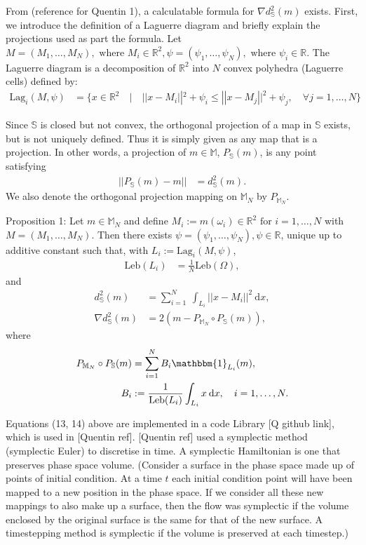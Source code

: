 \documentclass[11pt, oneside]{article}   	%
\newcommand{\R}{\mathbb{R}}
\newcommand{\MN}{\mathbb{M}_N}
\newcommand{\dsmsq}{d^{2}_{\mathbb{S}}(m)}
\newcommand{\graddsmsq}{\nabla{d^{2}_{\mathbb{S}}(m)}}
\newcommand{\M}{\mathbb{M}}
\newcommand{\Sb}{\mathbb{S}}
\newcommand{\Leb}{\mathrm{Leb}}
\begin{document}
From (reference for Quentin 1), a calculatable formula for \(\graddsmsq\) exists. First, we introduce the definition of a Laguerre diagram and briefly explain the projections used as part the formula. Let \(M = (M_1,\dots,M_N), \text{ where } M_i \in \R^2, \psi = (\psi_1,\dots,\psi_N), \text{ where } \psi_i \in \R\). The Laguerre diagram is a decomposition of \(\R^2\) into \(N\) convex polyhedra (Laguerre cells) defined by:
\begin{align}
\mathrm{Lag}_i(M, \psi) &= \{x \in \R^2 \quad | \quad || x - M_i ||^2 + \psi_i \le || x - M_j ||^2 + \psi_j, \quad \forall j = 1,\dots,N\}
\end{align}

Since \(\Sb\) is closed but not convex, the orthogonal projection of a map in \(\Sb\) exists, but is not uniquely defined. Thus it is simply given as any map that is a projection. In other words, a projection of \(m \in \M\), \(P_\Sb(m)\), is any point satisfying
\begin{align}
|| P_\Sb(m) - m || &= \dsmsq.
\end{align}
We also denote the orthogonal projection mapping on \(\MN\) by \(P_{\MN}\).

Proposition 1: Let \(m \in \MN\) and define \(M_i := m(\omega_i) \in \R^2 \text{ for } i = 1,\dots,N\) with \(M = (M_1,\dots,M_N)\). Then there exists \(\psi = (\psi_1,\dots,\psi_N), \psi \in \R\), unique up to additive constant such that, with \(L_i := \mathrm{Lag}_i(M, \psi)\), 
\begin{align}
\Leb(L_i) &= \frac{1}{N}\Leb(\Omega),
\end{align}
and
\begin{align}
\dsmsq & = \sum_{i=1}^N \: \int_{L_i} || x - M_i ||^2 \: \mathrm{d}x, \\
\graddsmsq &= 2(m - P_{\MN} \circ P_{\mathbb{S}}(m)),
\end{align}
where
\begin{align}
P_{\MN} \circ P_{\mathbb{S}}(m) &= \sum^N_{i=1} B_i \mathbbm{1}_{L_i}(m), \\
B_i &:= \frac{1}{\Leb(L_i)} \int_{L_i} x \: \mathrm{d}x, \quad i = 1,\dots,N. 
\end{align}

Equations (13, 14) above are implemented in a code Library [Q github link], which is used in [Quentin ref]. [Quentin ref] used a symplectic method (symplectic Euler) to discretise in time. A symplectic Hamiltonian is one that preserves phase space volume. (Consider a surface in the phase space made up of points of initial condition. At a time \(t\) each initial condition point will have been mapped to a new position in the phase space. If we consider all these new mappings to also make up a surface, then the flow was symplectic if the volume enclosed by the original surface is the same for that of the new surface. A timestepping method is symplectic if the volume is preserved at each timestep.)
\end{document}
